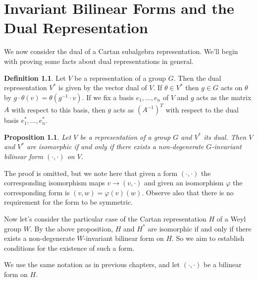 \documentclass[11pt,a4paper]{report}
\newtheorem{proposition}[theorem]{Proposition}
\theoremstyle{definition}
\newtheorem{definition}[theorem]{Definition}
\begin{document}
\begin{figure}[h]
\centering
{}
\end{figure}

\chapter{Invariant Bilinear Forms and the Dual Representation}

\label{chap:6}
We now consider the dual of a Cartan subalgebra representation. We'll begin with proving some facts about dual representations in general.

\begin{definition}Let $V$ be a representation of a group $G$. Then the dual representation $V^*$ is given by the vector dual of $V$. If $\theta \in V^*$ then $g \in G$ acts on $\theta$ by $g \cdot \theta (v) = \theta(g^{-1} \cdot v)$. If we fix a basis $e_1, \ldots, e_n$ of $V$ and $g$ acts as the matrix $A$ with respect to this basis, then $g$ acts as $(A^{-1})^T$ with respect to the dual basis $e_1^*, \ldots, e_n^*$. \end{definition}

\begin{proposition}\label{prop:isomorphiffform} Let $V$ be a representation of a group $G$ and $V^*$ its dual. Then $V$ and $V^*$ are isomorphic if and only if there exists a non-degenerate $G$-invariant bilinear form $(\cdot, \cdot)$ on $V$. \end{proposition}

The proof is omitted, but we note here that given a form $(\cdot, \cdot)$ the corresponding isomorphism maps $v \to (v, \cdot)$ and given an isomorphism $\varphi$ the corresponding form is $(v, w) = \varphi(v)(w)$. Observe also that there is no requirement for the form to be symmetric. 

Now let's consider the particular case of the Cartan representation $H$ of a Weyl group $W$. By the above proposition, $H$ and $H^*$ are isomorphic if and only if there exists a non-degenerate $W$-invariant bilinear form on $H$. So we aim to establish conditions for the existence of such a form.

We use the same notation as in previous chapters, and let $(\cdot, \cdot)$ be a bilinear form on $H$. 
\end{document}
